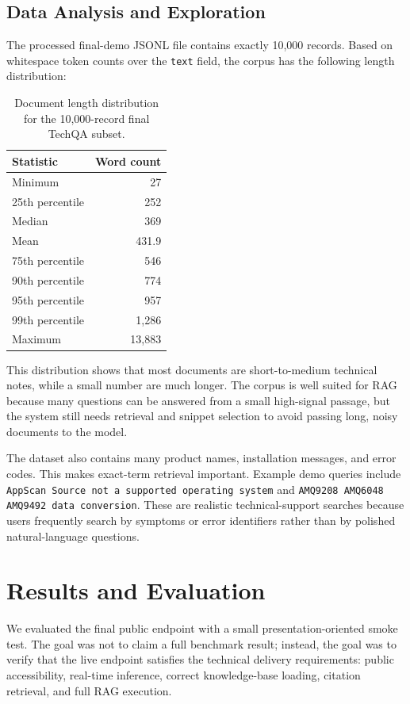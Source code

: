 \documentclass[paper=a4, fontsize=11pt]{scrartcl}
\begin{document}
\subsection{Data Analysis and Exploration}

The processed final-demo JSONL file contains exactly 10,000 records. Based on whitespace token counts over the \texttt{text} field, the corpus has the following length distribution:

\begin{table}[h]
\centering
\begin{tabular}{lr}
\toprule
Statistic & Word count \\
\midrule
Minimum & 27 \\
25th percentile & 252 \\
Median & 369 \\
Mean & 431.9 \\
75th percentile & 546 \\
90th percentile & 774 \\
95th percentile & 957 \\
99th percentile & 1,286 \\
Maximum & 13,883 \\
\bottomrule
\end{tabular}
\caption{Document length distribution for the 10,000-record final TechQA subset.}
\end{table}

This distribution shows that most documents are short-to-medium technical notes, while a small number are much longer. The corpus is well suited for RAG because many questions can be answered from a small high-signal passage, but the system still needs retrieval and snippet selection to avoid passing long, noisy documents to the model.

The dataset also contains many product names, installation messages, and error codes. This makes exact-term retrieval important. Example demo queries include \texttt{AppScan Source not a supported operating system} and \texttt{AMQ9208 AMQ6048 AMQ9492 data conversion}. These are realistic technical-support searches because users frequently search by symptoms or error identifiers rather than by polished natural-language questions.

\section{Results and Evaluation}

We evaluated the final public endpoint with a small presentation-oriented smoke test. The goal was not to claim a full benchmark result; instead, the goal was to verify that the live endpoint satisfies the technical delivery requirements: public accessibility, real-time inference, correct knowledge-base loading, citation retrieval, and full RAG execution.
\end{document}
